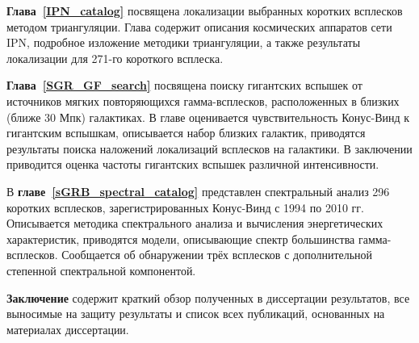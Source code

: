 \textbf{Глава~\ref{IPN_catalog}} посвящена локализации выбранных коротких всплесков 
методом триангуляции. Глава содержит описания космических аппаратов сети IPN, 
подробное изложение методики триангуляции, а также результаты локализации для 271-го короткого всплеска.  

\textbf{Глава~\ref{SGR_GF_search}} посвящена поиску гигантских вспышек от источников
мягких повторяющихся гамма-всплесков, расположенных в близких (ближе 30 Мпк) галактиках.
В главе оценивается чувствительность Конус-Винд к гигантским вспышкам, 
описывается набор близких галактик, приводятся результаты поиска наложений локализаций
всплесков на галактики. В заключении приводится оценка частоты гигантских вспышек различной 
интенсивности.

В \textbf{главе~\ref{sGRB_spectral_catalog}} представлен спектральный анализ 296
коротких всплесков, зарегистрированных Конус-Винд с 1994 по 2010 гг. 
Описывается методика спектрального анализа и вычисления энергетических характеристик,
приводятся модели, описывающие спектр большинства гамма-всплесков.
Сообщается об обнаружении трёх всплесков с дополнительной степенной спектральной
компонентой. 

\textbf{Заключение} содержит краткий обзор полученных в диссертации результатов, 
все выносимые на защиту результаты и список всех публикаций, 
основанных на материалах диссертации.

\clearpage